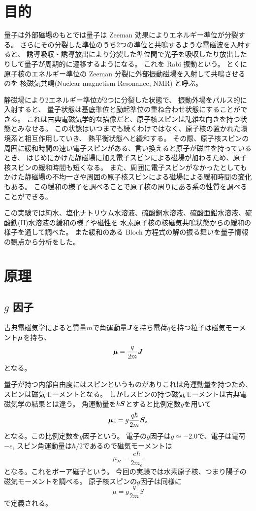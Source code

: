 \documentclass[11pt,dvipdfmx,a4paper]{jsarticle}
\begin{document}
\section{目的}
量子は外部磁場のもとでは量子は Zeeman 効果によりエネルギー準位が分裂する。
さらにその分裂した準位のうち2つの準位と共鳴するような電磁波を入射すると、
誘導吸収・誘導放出により分裂した準位間で光子を吸収したり放出したりして量子が周期的に遷移するようになる。
これを Rabi 振動という。
とくに原子核のエネルギー準位の Zeeman 分裂に外部振動磁場を入射して共鳴させるのを
核磁気共鳴(Nuclear magnetism Resonance, NMR) と呼ぶ。

静磁場により2エネルギー準位が2つに分裂した状態で、
振動外場をパルス的に入射すると、
量子状態は基底準位と励起準位の重ね合わせ状態にすることができる。
これは古典電磁気学的な描像だと、原子核スピンは乱雑な向きを持つ状態とみなせる。
この状態はいつまでも続くわけではなく、原子核の置かれた環境系と相互作用していき、
熱平衡状態へと緩和する。
その際、原子核スピンの周囲に緩和時間の速い電子スピンがある、言い換えると原子が磁性を持っているとき、
はじめにかけた静磁場に加え電子スピンによる磁場が加わるため、原子核スピンの緩和時間も短くなる。
また、周囲に電子スピンがなかったとしてもかけた静磁場の不均一さや周囲の原子核スピンによる磁場による緩和時間の変化もある。
この緩和の様子を調べることで原子核の周りにある系の性質を調べることができる。

この実験では純水、塩化ナトリウム水溶液、硫酸銅水溶液、硫酸亜鉛水溶液、硫酸鉄(II)水溶液の緩和の様子や磁性を
水素原子核の核磁気共鳴状態からの緩和の様子を通して調べた。
また緩和のある Bloch 方程式の解の振る舞いを量子情報の観点から分析をした。

\section{原理}
\subsection{\(g\) 因子}
古典電磁気学によると質量\(m\)で角運動量\(\vb*{J}\)を持ち電荷\(q\)を持つ粒子は磁気モーメント\(\vb*{\mu}\)を持ち、
\begin{equation}
	\vb*{\mu} = \frac{q}{2m} \vb*{J}
\end{equation}
となる。

量子が持つ内部自由度にはスピンというものがありこれは角運動量を持つため、
スピンは磁気モーメントとなる。
しかしスピンの持つ磁気モーメントは古典電磁気学の結果とは違う。
角運動量を\(\hbar\vb*{S}\)とすると比例定数\(g\)を用いて
\begin{equation}
	\vb*{\mu}_z = g\frac{q\hbar}{2m} \vb*{S}_z
\end{equation}
となる。この比例定数を\(g\)因子という。
電子の\(g\)因子は\(g \simeq -2.0\)で、電子は電荷\(-e\), スピン角運動量は\(\hbar/2\)であるので磁気モーメントは
\begin{equation}
	\mu_B = \frac{e\hbar}{2m_e}
\end{equation}
となる。これをボーア磁子という。
今回の実験では水素原子核、つまり陽子の磁気モーメントを調べる。
原子核スピンの\(g\)因子は同様に
\begin{equation}
	\mu = g \frac{q}{2m} S
\end{equation}
で定義される。
\end{document}
